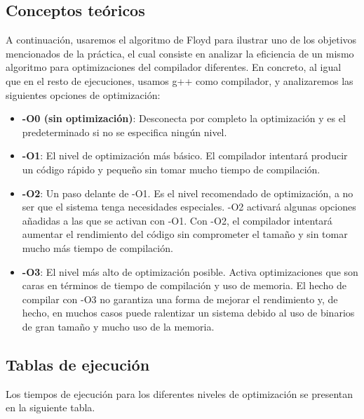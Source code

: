 \documentclass{homework}
\begin{document}
    \subsection{Conceptos teóricos}

    A continuación, usaremos el algoritmo de Floyd para ilustrar uno de los objetivos mencionados de la práctica, 
    el cual consiste en analizar la eficiencia de un mismo algoritmo para optimizaciones del compilador diferentes.
    En concreto, al igual que en el resto de ejecuciones, usamos g++ como compilador, y analizaremos las siguientes
    opciones de optimización:

    \begin{itemize}
        \item \textbf{-O0 (sin optimización)}: Desconecta por completo la optimización y es el predeterminado si 
        no se especifica ningún nivel.
        \item \textbf{-O1}: El nivel de optimización más básico. El compilador intentará producir un código rápido
        y pequeño sin tomar mucho tiempo de compilación. 
        \item \textbf{-O2}: Un paso delante de -O1. Es el nivel recomendado de optimización, a no ser que el sistema
        tenga necesidades especiales. -O2 activará algunas opciones añadidas a las que se activan con -O1. 
        Con -O2, el compilador intentará aumentar el rendimiento del código sin comprometer el tamaño y sin tomar 
        mucho más tiempo de compilación.
        \item \textbf{-O3}:  El nivel más alto de optimización posible. Activa optimizaciones que son caras en términos 
        de tiempo de compilación y uso de memoria. El hecho de compilar con -O3 no garantiza una forma de mejorar el 
        rendimiento y, de hecho, en muchos casos puede ralentizar un sistema debido al uso de binarios de gran tamaño y 
        mucho uso de la memoria.
    \end{itemize} 
    
    \subsection{Tablas de ejecución} 

    Los tiempos de ejecución para los diferentes niveles de optimización se presentan en la siguiente tabla. 
\end{document}
